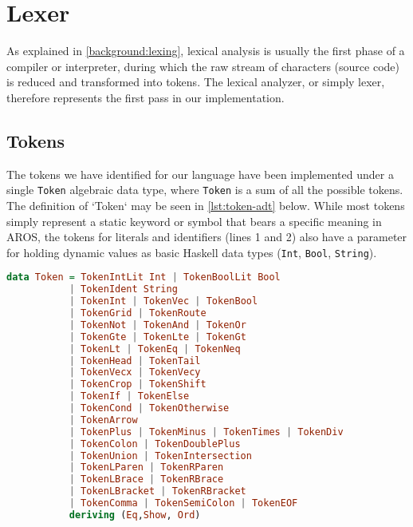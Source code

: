 \section{Lexer}
\label{sec:impl:lexer}
As explained in \cref{background:lexing}, lexical analysis is usually the first phase of a compiler or interpreter, during which the raw stream of characters (source code) is reduced and transformed into tokens. The lexical analyzer, or simply lexer, therefore represents the first pass in our implementation.
\subsection{Tokens}
The tokens we have identified for our language have been implemented under a single \lstinline{Token} algebraic data type, where \lstinline{Token} is a sum of all the possible tokens. The definition of `Token` may be seen in \cref{lst:token-adt} below.
While most tokens simply represent a static keyword or symbol that bears a specific meaning in AROS, the tokens for literals and identifiers (lines 1 and 2) also have a parameter for holding dynamic values as basic Haskell data types (\lstinline{Int}, \lstinline{Bool}, \lstinline{String}). 
\begin{lstlisting}[language=haskell, float=h,
caption=AROS tokens represented using a Haskell algebraic data type,
label=lst:token-adt]
data Token = TokenIntLit Int | TokenBoolLit Bool
           | TokenIdent String
           | TokenInt | TokenVec | TokenBool
           | TokenGrid | TokenRoute
           | TokenNot | TokenAnd | TokenOr
           | TokenGte | TokenLte | TokenGt
           | TokenLt | TokenEq | TokenNeq
           | TokenHead | TokenTail
           | TokenVecx | TokenVecy
           | TokenCrop | TokenShift
           | TokenIf | TokenElse
           | TokenCond | TokenOtherwise
           | TokenArrow
           | TokenPlus | TokenMinus | TokenTimes | TokenDiv
           | TokenColon | TokenDoublePlus
           | TokenUnion | TokenIntersection
           | TokenLParen | TokenRParen
           | TokenLBrace | TokenRBrace
           | TokenLBracket | TokenRBracket
           | TokenComma | TokenSemiColon | TokenEOF
           deriving (Eq,Show, Ord)
\end{lstlisting}
